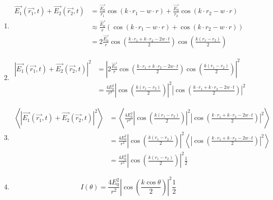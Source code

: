 \documentclass[a4paper,10pt]{hw}
\begin{document}
\begin{enumerate}

\item
\begin{align*}
\vec{E_1}(\vec{r_1}, t) + \vec{E_2}(\vec{r_2}, t)
&= \frac{\vec{E_0}}{r_1}\cos{(k\cdot r_1 - w\cdot r)} + \frac{\vec{E_0}}{r_2}\cos{(k\cdot r_2 -w\cdot r)}\\
&\approx \frac{\vec{E_0}}{r} \left( \cos{(k\cdot r_1 - w\cdot r)}+\cos{(k\cdot r_2 -w\cdot r)}\right) \\
&= \boxed{2\frac{\vec{E_0}}{r}\cos{\left( \frac{k\cdot r_1 + k\cdot r_2 - 2w\cdot t}{2} \right)} \cos{\left(\frac{k(r_1 - r_2)}{2}\right)}}
\end{align*}

\item
\begin{align*}
|\vec{E_1}(\vec{r_1}, t) + \vec{E_2}(\vec{r_2}, t)|^2
&= \left|2\frac{\vec{E_0}}{r}\cos{\left( \frac{k\cdot r_1 + k\cdot r_2 - 2w\cdot t}{2} \right)} \cos{\left(\frac{k(r_1 - r_2)}{2}\right)}\right|^2 \\
&= \frac{4E_0^2}{r^2}\left|\cos{\left(\frac{k(r_1 - r_2)}{2}\right)}\right|^2 \left|\cos{\left( \frac{k\cdot r_1 + k\cdot r_2 - 2w\cdot t}{2} \right)}\right|^2
\end{align*}

\item
\begin{align*}
\left<|\vec{E_1}(\vec{r_1}, t) + \vec{E_2}(\vec{r_2}, t)|^2\right>
&= \left<\frac{4E_0^2}{r^2}\left|\cos{\left(\frac{k(r_1 - r_2)}{2}\right)}\right|^2 \left|\cos{\left( \frac{k\cdot r_1 + k\cdot r_2 - 2w\cdot t}{2} \right)}\right|^2\right>\\
&= \frac{4E_0^2}{r^2}\left|\cos{\left(\frac{k(r_1 - r_2)}{2}\right)}\right|^2 \left<\left|\cos{\left( \frac{k\cdot r_1 + k\cdot r_2 - 2w\cdot t}{2} \right)}\right|^2\right>\\
&= \frac{4E_0^2}{r^2}\left|\cos{\left(\frac{k(r_1 - r_2)}{2}\right)}\right|^2 \frac{1}{2}
\end{align*}

\item
$$
\boxed{I(\theta) = \frac{4E_0^2}{r^2}\left|\cos{\left(\frac{k\cos{\theta}}{2}\right)}\right|^2 \frac{1}{2}}
$$

\end{enumerate}
\end{document}
